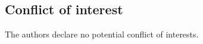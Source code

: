 \documentclass[preprint,12pt]{elsarticle}
\begin{document}
\subsection*{Conflict of interest}

The authors declare no potential conflict of interests.


  
 





\end{document}
